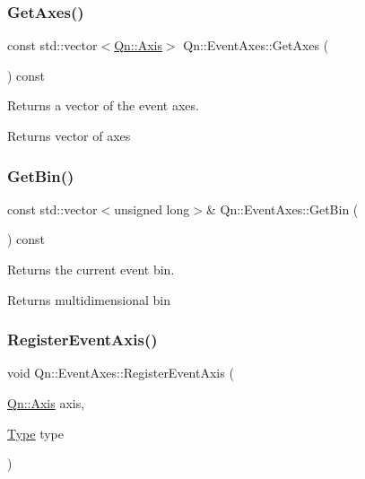\subsubsection{\texorpdfstring{Get\+Axes()}{GetAxes()}}
{\footnotesize\ttfamily const std\+::vector$<$\mbox{\hyperlink{classQn_1_1Axis}{Qn\+::\+Axis}}$>$ Qn\+::\+Event\+Axes\+::\+Get\+Axes (\begin{DoxyParamCaption}{ }\end{DoxyParamCaption}) const\hspace{0.3cm}{\ttfamily [inline]}}



Returns a vector of the event axes. 

\begin{DoxyReturn}{Returns}
vector of axes 
\end{DoxyReturn}
\mbox{\label{classQn_1_1EventAxes_a76d3881ef0c333be3044c6b0b706e7e7}} 
\subsubsection{\texorpdfstring{Get\+Bin()}{GetBin()}}
{\footnotesize\ttfamily const std\+::vector$<$unsigned long$>$\& Qn\+::\+Event\+Axes\+::\+Get\+Bin (\begin{DoxyParamCaption}{ }\end{DoxyParamCaption}) const\hspace{0.3cm}{\ttfamily [inline]}}



Returns the current event bin. 

\begin{DoxyReturn}{Returns}
multidimensional bin 
\end{DoxyReturn}
\mbox{\label{classQn_1_1EventAxes_a4ddaaed5f02c92e5fa6696be9bf397e9}} 
\subsubsection{\texorpdfstring{Register\+Event\+Axis()}{RegisterEventAxis()}}
{\footnotesize\ttfamily void Qn\+::\+Event\+Axes\+::\+Register\+Event\+Axis (\begin{DoxyParamCaption}\item[{\mbox{\hyperlink{classQn_1_1Axis}{Qn\+::\+Axis}}}]{axis,  }\item[{\mbox{\hyperlink{classQn_1_1EventAxes_a81ebc6649920a462e33c176287b8706c}{Type}}}]{type }\end{DoxyParamCaption})}



